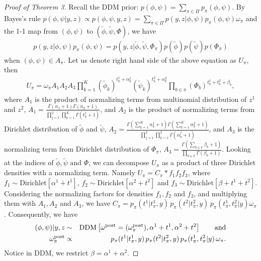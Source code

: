 \documentclass[aoas,preprint]{imsart}
\begin{document}
\begin{proof}[Proof of Theorem 3]
Recall the DDM prior: $p(\phi,\psi) = \sum_{\pi \in \Pi} p_\pi(\phi,\psi)$. 
By Bayes's rule $p(\phi,\psi | y,z) \propto p(\phi,\psi, y, z) = \sum_{\pi \in \Pi}  p(y, z | \phi,\psi) p_\pi(\phi,\psi)\omega_\pi$
and the 1-1 map from $(\phi,\psi)$ to $(\tilde \phi, \tilde \psi, \Phi)$, we have
\begin{eqnarray*}
p(y, z | \phi,\psi) p_\pi(\phi,\psi) = p(y, z | \tilde{\phi} , \tilde{\psi}, \Phi_\pi) p(\tilde{\phi}) p (\tilde{\psi}) p(\Phi_\pi)
\end{eqnarray*}
when $(\phi,\psi) \in A_\pi$.
Let us denote right hand side of the above equation as $U_\pi$, then
\begin{eqnarray*}
U_\pi = \omega_\pi A_1 A_2 A_3\prod_{k = 1}^K (\tilde{ \phi }_k)^{t_k^1 + \alpha_k^1} (\tilde{ \psi }_k)^{t_k^2 + \alpha_k^2}   \prod_{b \in \pi} (\Phi_b)^{t_b^1 + t_b^2 + \beta_b},
\end{eqnarray*}
where $A_1$ is the product of normalizing terms from multinomial distribution of $z^1$ and $z^2$, $A_1 =  \frac{\Gamma(n_1 + 1)\Gamma(n_2 + 1)}{\prod_{j = 1}^2\prod_{k = 1}^K \Gamma(t_k^j + 1) } $, and
$A_2$ is the product of normalizing terms from Dirichlet distribution of $\tilde{\phi}$ and $\tilde{\psi}$,
$A_2 = \frac{ \Gamma( \sum_{k = 1}^K \alpha_k^1 + 1)  \Gamma( \sum_{k = 1}^K \alpha_k^2 + 1)}{ \prod_{j = 1}^2 \prod_{k = 1}^2 \Gamma(\alpha_k^j + 1)}$, and
$A_3$ is the normalizing term from Dirichlet distribution of $\Phi_\pi$, $A_3 = \frac{\Gamma(\sum_{b \in \pi } \beta_b + 1)}{\prod_{b\in \pi} \Gamma(\beta_b + 1)}$.  Looking at the indices of $\tilde \phi, \tilde \psi \text{ and } \Phi$, we can decompose $U_\pi$ as a product of three Dirichlet densities with a normalizing term. 
Namely $U_\pi = C_\pi * f_1 f_2 f_3$, where
$f_1 \sim \text{Dirichlet}[\alpha^1 + t^1]$, $f_2 \sim \text{Dirichlet}[\alpha^2 + t^2]$ and $f_3 \sim \text{Dirichlet}[\beta + t^1 + t^2]$.
Considering the normalizing factors for densities $f_1,f_2$ and $f_3$, and multiplying them with $A_1, A_2$ and $A_3$,
we have $C_\pi =  p_\pi(t^1 | t^1_{\pi},y)\, p_\pi(t^2|  t^2_{\pi},y )
 \, p_\pi( t^1_{\pi}, t^2_{\pi} | y ) \omega_\pi$.  Consequently, we have 
 \begin{eqnarray*}
 (\phi,\psi)|y,z  &\sim& {\mbox {\rm DDM}}\left[ \omega^{\rm post}=(\omega^{\rm post}_\pi), \alpha^1 + t^1, \alpha^2 + t^2  \right]  \qquad {\mbox {\rm and}} \\
   \omega^{\rm post}_\pi &\propto &
 p_\pi(t^1 | t^1_{\pi},y)\, p_\pi(t^2|  t^2_{\pi},y )
 \, p_\pi( t^1_{\pi}, t^2_{\pi} | y ) \, \omega_\pi.\\
 \end{eqnarray*}
 Notice in DDM, we restrict $\beta = \alpha^1 + \alpha^2$.

\end{proof}
\end{document}
